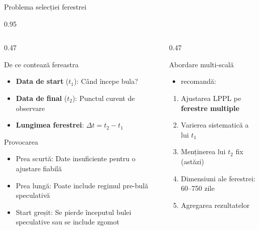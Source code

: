 \documentclass[9pt, aspectratio=169, t]{beamer}
\begin{document}
\begin{frame}{Problema selecției ferestrei}
    \begin{cminipage}{0.95\textwidth}
    {\footnotesize
    \begin{columns}[T]
        \begin{column}{0.47\textwidth}
            \begin{block}{De ce contează fereastra}
                \begin{itemize}\setlength{\itemsep}{0pt}
                    \item \textbf{Data de start} ($t_1$): Când începe bula?
                    \item \textbf{Data de final} ($t_2$): Punctul curent de observare
                    \item \textbf{Lungimea ferestrei}: $\Delta t = t_2 - t_1$
                \end{itemize}
            \end{block}

            \begin{alertblock}{Provocarea}
                \begin{itemize}\setlength{\itemsep}{0pt}
                    \item Prea scurtă: Date insuficiente pentru o ajustare fiabilă
                    \item Prea lungă: Poate include regimul pre-bulă speculativă
                    \item Start greșit: Se pierde începutul bulei speculative sau se include zgomot
                \end{itemize}
            \end{alertblock}
        \end{column}
        \begin{column}{0.47\textwidth}
            \begin{exampleblock}{Abordare multi-scală}
                \begin{itemize}\setlength{\itemsep}{0pt}
                    \item [\href{https://doi.org/10.1142/S2010139215500044}{Sornette et al., 2015}] recomandă:
                \end{itemize}
                \begin{enumerate}\setlength{\itemsep}{0pt}
                    \item Ajustarea LPPL pe \textbf{ferestre multiple}
                    \item Varierea sistematică a lui $t_1$
                    \item Menținerea lui $t_2$ fix (astăzi)
                    \item Dimensiuni ale ferestrei: 60--750 zile
                    \item Agregarea rezultatelor
                \end{enumerate}
            \end{exampleblock}


\end{column}
\end{columns}}
\end{cminipage}
\end{frame}
\end{document}
